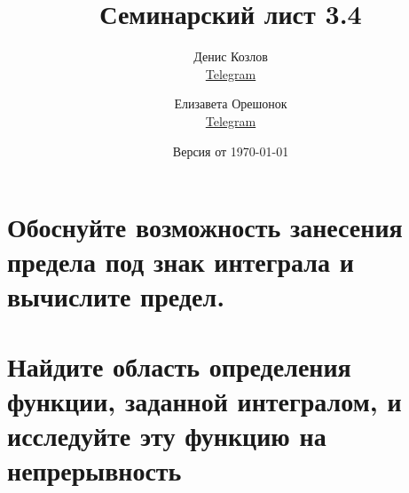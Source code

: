\documentclass[a4paper, fleqn]{article}
\title{Семинарский лист 3.4}
\author{
    Денис Козлов         \\ \href{https://t.me/DKozl50}{Telegram} \and
    Елизавета Орешонок   \\ \href{https://t.me/eaoresh}{Telegram} \and
}
\date{Версия от {\ddmmyyyydate\today} \currenttime}
\begin{document}
\maketitle


\section*{Обоснуйте возможность занесения предела под знак интеграла и вычислите предел.}






\section*{Найдите область определения функции, заданной интегралом, 
    и исследуйте эту функцию на непрерывность}
\end{document}

